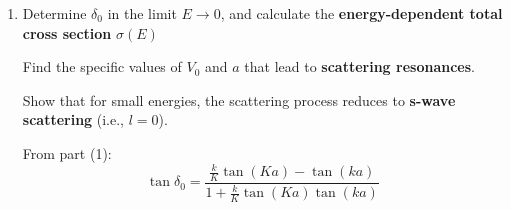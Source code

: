 \documentclass[11pt,a4paper]{scrartcl}
\begin{document}
\begin{enumerate}
\begin{enumerate}
\begin{calculationbox}
                        Therefore
                        \[
                        K \approx k.
                        \]

                        Hence
                        \[
                        \frac{k}{K} \to 1,
                        \qquad
                        Ka \to ka.
                        \]

                        Insert this into the expression for $\tan\delta_0$:
                        \[
                        \tan\delta_0
                        =
                        \frac{\tan(ka)-\tan(ka)}
                        {1+\tan^2(ka)}
                        =
                        0.
                        \]

                        Thus
                        \[
                        \boxed{\delta_0 \to 0}
                        \]
                        for $E \to \infty$.
                    \end{calculationbox}

                    Physical interpretation:
                    \begin{calculationbox}
                        At very high energy, the particle is barely affected by the finite potential well.

                        The wavelength is very small compared to the length scale of the potential, and the scattering phase shift vanishes.

                        Therefore, the potential becomes effectively transparent:
                        \[
                        \boxed{\delta_0 \to 0}
                        \]
                        means almost no scattering.
                    \end{calculationbox}

                \item 
                     Determine $\delta_0$ in the limit $E \to 0$, and calculate the \textbf{energy-dependent total cross section} $\sigma(E)$

                     Find the specific values of $V_0$ and $a$ that lead to \textbf{scattering resonances}.

                     Show that for small energies, the scattering process reduces to \textbf{s-wave scattering} (i.e., $l=0$).
                     \begin{calculationbox}
                        From part (1):
                        \[
                        \tan\delta_0
                        =
                        \frac{\frac{k}{K}\tan(Ka)-\tan(ka)}
                        {1+\frac{k}{K}\tan(Ka)\tan(ka)}
                        \]


\end{calculationbox}
\end{enumerate}
\end{enumerate}
\end{document}
